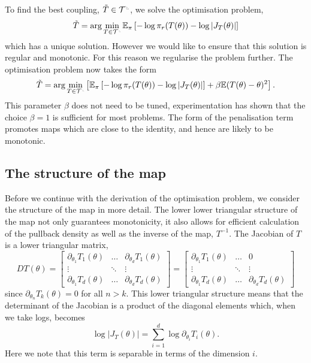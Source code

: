 \documentclass[final]{siamltex}
\newcommand{\ltri}{%
\,\resizebox{!}{0.25\baselineskip}{%
\begin{tikzpicture}%
\draw[line width=1mm](0,0) -- (0,2) -- (2,0)  -- (0,0);
\end{tikzpicture}%
}\xspace%
}%
\newcommand{\smallltri}{%
\,\resizebox{!}{0.15\baselineskip}{%
\begin{tikzpicture}%
\draw[line width=1mm](0,0) -- (0,2) -- (2,0)  -- (0,0);
\end{tikzpicture}%
}\xspace%
}%
\begin{document}
To find the best coupling, $\tilde{T} \in \mathcal{T}^{\ltri}$, we solve the optimisation problem,
\[
	\tilde{T} = \arg\min_{T \in \mathcal{T}^{\smallltri}} \mathbb{E}_\pi\left[-\log\pi_r(T(\theta)) -
		\log\left|J_T(\theta)\right|\right]
\]
which has a unique solution. However we would like to ensure that this solution is regular and monotonic. For this
reason we regularise the problem further. The optimisation problem now takes the form
\begin{equation}\label{eq:gen_map_optim}
	\tilde{T} = \arg\min_{T\in\mathcal{T}^{\smallltri}} \left[
		 \mathbb{E}_\pi\left[-\log\pi_r(T(\theta)) -
		\log\left|J_T(\theta)\right|\right] + \beta\mathbb{E}(T(\theta)- \theta)^2 \right].
\end{equation}
This parameter $\beta$ does not need to be tuned, experimentation has shown that the choice
$\beta=1$ is sufficient for most problems. The form of the penalisation term promotes maps which are
close to the identity, and hence are likely to be monotonic.

\subsection{The structure of the map}

Before we continue with the derivation of the optimisation problem, we consider the structure
of the map in more detail. The lower lower triangular structure of the map not only guarantees monotonicity, it also allows for efficient calculation of the pullback density as well as the inverse of the map, $T^{-1}$. The Jacobian of $T$ is a lower triangular matrix,
\[
	DT(\theta) = \begin{bmatrix}
		\partial_{\theta_1} T_1(\theta) & \dots & \partial_{\theta_d} T_1(\theta)\\
		\vdots & \ddots & \vdots \\
		\partial_{\theta_1} T_d(\theta) & \dots & \partial_{\theta_d} T_d(\theta)
	\end{bmatrix} = \begin{bmatrix}
		\partial_{\theta_1} T_1(\theta) & \dots & 0\\
		\vdots & \ddots & \vdots \\
		\partial_{\theta_1} T_d(\theta) & \dots & \partial_{\theta_d} T_d(\theta)
	\end{bmatrix}
\]
since $\partial_{\theta_n} T_k(\theta) = 0$ for all $n > k$. This lower triangular structure means that the determinant of the Jacobian is a product of the diagonal elements which, when we take logs, becomes
\begin{equation}\label{eqn:separable_jacobian}
	\log\left|J_T(\theta)\right| = \sum\limits_{i=1}^d \! \log \partial_{\theta_i} T_i(\theta).
\end{equation}
Here we note that this term is separable in terms of the dimension $i$.
\end{document}
